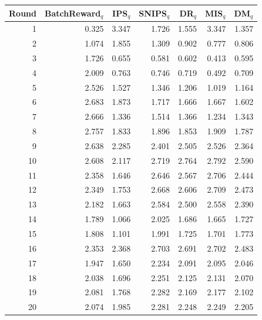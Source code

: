 \begin{tabular}{rrrrrrr}
\toprule
Round & BatchReward$_q$ & IPS$_q$ & SNIPS$_q$ & DR$_q$ & MIS$_q$ & DM$_q$ \\
\midrule
1 & 0.325 & 3.347 & 1.726 & 1.555 & 3.347 & 1.357 \\
2 & 1.074 & 1.855 & 1.309 & 0.902 & 0.777 & 0.806 \\
3 & 1.726 & 0.655 & 0.581 & 0.602 & 0.413 & 0.595 \\
4 & 2.009 & 0.763 & 0.746 & 0.719 & 0.492 & 0.709 \\
5 & 2.526 & 1.527 & 1.346 & 1.206 & 1.019 & 1.164 \\
6 & 2.683 & 1.873 & 1.717 & 1.666 & 1.667 & 1.602 \\
7 & 2.666 & 1.336 & 1.514 & 1.366 & 1.234 & 1.343 \\
8 & 2.757 & 1.833 & 1.896 & 1.853 & 1.909 & 1.787 \\
9 & 2.638 & 2.285 & 2.401 & 2.505 & 2.526 & 2.364 \\
10 & 2.608 & 2.117 & 2.719 & 2.764 & 2.792 & 2.590 \\
11 & 2.358 & 1.646 & 2.646 & 2.567 & 2.706 & 2.444 \\
12 & 2.349 & 1.753 & 2.668 & 2.606 & 2.709 & 2.473 \\
13 & 2.182 & 1.663 & 2.584 & 2.500 & 2.558 & 2.390 \\
14 & 1.789 & 1.066 & 2.025 & 1.686 & 1.665 & 1.727 \\
15 & 1.808 & 1.101 & 1.991 & 1.725 & 1.701 & 1.773 \\
16 & 2.353 & 2.368 & 2.703 & 2.691 & 2.702 & 2.483 \\
17 & 1.947 & 1.650 & 2.234 & 2.091 & 2.095 & 2.046 \\
18 & 2.038 & 1.696 & 2.251 & 2.125 & 2.131 & 2.070 \\
19 & 2.081 & 1.768 & 2.282 & 2.169 & 2.177 & 2.102 \\
20 & 2.074 & 1.985 & 2.281 & 2.248 & 2.249 & 2.205 \\
\bottomrule
\end{tabular}
